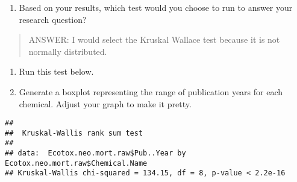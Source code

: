 \documentclass[]{article}
\newenvironment{Shaded}{\begin{snugshade}}{\end{snugshade}}
\newcommand{\KeywordTok}[1]{\textcolor[rgb]{0.13,0.29,0.53}{\textbf{#1}}}
\newcommand{\DataTypeTok}[1]{\textcolor[rgb]{0.13,0.29,0.53}{#1}}
\newcommand{\StringTok}[1]{\textcolor[rgb]{0.31,0.60,0.02}{#1}}
\newcommand{\CommentTok}[1]{\textcolor[rgb]{0.56,0.35,0.01}{\textit{#1}}}
\newcommand{\OperatorTok}[1]{\textcolor[rgb]{0.81,0.36,0.00}{\textbf{#1}}}
\newcommand{\NormalTok}[1]{#1}
\providecommand{\tightlist}{%
  \setlength{\itemsep}{0pt}\setlength{\parskip}{0pt}}
\begin{document}
\begin{enumerate}
\def\labelenumi{\arabic{enumi}.}
\setcounter{enumi}{5}
\tightlist
\item
  Based on your results, which test would you choose to run to answer
  your research question?
\end{enumerate}

\begin{quote}
ANSWER: I would select the Kruskal Wallace test because it is not
normally distributed.
\end{quote}

\begin{enumerate}
\def\labelenumi{\arabic{enumi}.}
\setcounter{enumi}{6}
\item
  Run this test below.
\item
  Generate a boxplot representing the range of publication years for
  each chemical. Adjust your graph to make it pretty.
\end{enumerate}

\begin{Shaded}
\end{Shaded}

\begin{verbatim}
## 
##  Kruskal-Wallis rank sum test
## 
## data:  Ecotox.neo.mort.raw$Pub..Year by Ecotox.neo.mort.raw$Chemical.Name
## Kruskal-Wallis chi-squared = 134.15, df = 8, p-value < 2.2e-16
\end{verbatim}

\begin{Shaded}
\end{Shaded}
\end{document}
